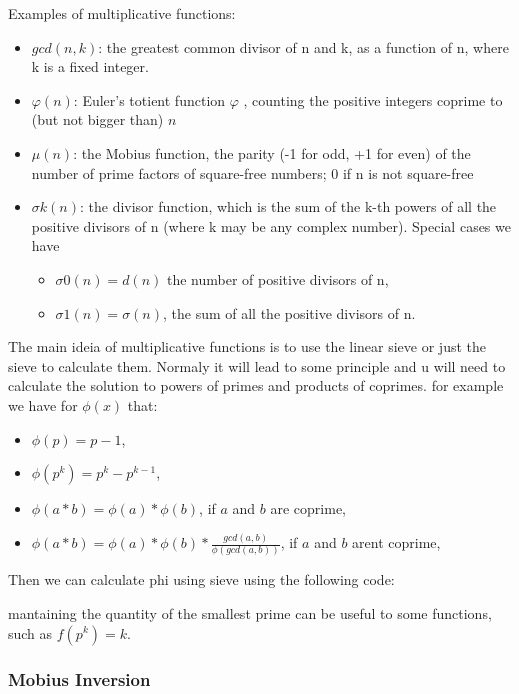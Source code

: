     Examples of multiplicative functions:
    \begin{itemize}
        \item $gcd(n,k)$: the greatest common divisor of n and k, as a function of n, where k is a fixed integer.
\item {$\displaystyle \varphi (n)$}: Euler's totient function 
{$\displaystyle \varphi$ }, counting the positive integers coprime to (but not bigger than) $n$
\item $\mu (n)$: the Mobius function, the parity (-1 for odd, +1 for even) of the number of prime factors of square-free numbers; 0 if n is not square-free
\item $\sigma k(n)$: the divisor function, which is the sum of the k-th powers of all the positive divisors of n (where k may be any complex number). Special cases we have
\begin{itemize}
    \item $\sigma 0(n) = d(n)$ the number of positive divisors of n,
    \item $\sigma 1(n) = \sigma (n)$, the sum of all the positive divisors of n.
\end{itemize}
    \end{itemize}

    The main ideia of multiplicative functions is to use the linear sieve or just the sieve to calculate them. Normaly it will lead to some principle and u will need to calculate the solution to powers of primes and products of coprimes.
    for example we have for $\phi(x)$ that:
    \begin{itemize}
        \item $\phi(p) = p-1$,
        \item $\phi(p^k) = p^k -p^{k-1}$,
        \item $\phi(a*b) = \phi(a) * \phi(b)$, if $a$ and $b$ are coprime,
        \item $\phi(a*b) = \phi(a) * \phi(b) * \frac{gcd(a,b)}{\phi(gcd(a,b))}$, if $a$ and $b$ arent coprime,
    \end{itemize}

    Then we can calculate phi using sieve using the following code:


    mantaining the quantity of the smallest prime can be useful to some functions, such as $f(p^k) = k$.

    \subsubsection{Mobius Inversion}

